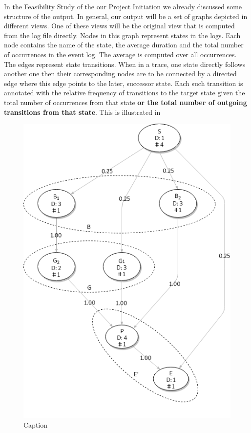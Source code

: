 \documentclass[12pt]{extarticle}
\begin{document}
In the Feasibility Study of the our Project Initiation we already discussed some structure of the output. In general, our output will be a set of graphs depicted in different views. One of these views will be the original view that is computed from the log file directly. Nodes in this graph represent states in the logs. Each node contains the name of the state, the average duration and the total number of occurrences in the event log. The average is computed over all occurrences.
The edges represent state transitions. When in a trace, one state directly follows another one then their corresponding nodes are to be connected by a directed edge where this edge points to the later, successor state. Each such transition is annotated with the relative frequency of transitions to the target state given the total number of occurrences from that state \textbf{or the total number of outgoing transitions from that state}. This is illustrated in 

\begin{figure}
    \centering
    \includegraphics[]{Diagrams/statemachine.png}
    \caption{Caption}
    \label{fig:my_label}
\end{figure}

\printbibliography
\end{document}
